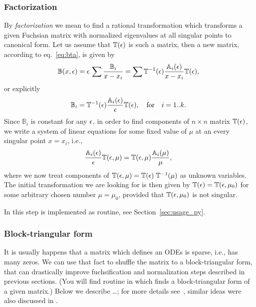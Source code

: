 \documentclass[12pt,a4paper]{article}
\def\M#1{\mathbb{#1}} %
\begin{document}
\subsubsection{Factorization}
\label{sec:fact}
By {\em factorization} we mean to find a rational transformation which transforms a given Fuchsian matrix with normalized eigenvalues at all singular points to canonical form.
Let us assume that $\M T(\eps)$ is such a matrix, then a new matrix, according to eq.~\eqref{eq:bta}, is given by
\begin{equation}
  \M B(x,\eps) = \eps\, \sum \frac{\M B_i}{x-x_i} = \sum \M T^{-1}(\eps) \frac{\M A_i(\eps)}{x-x_i} \M T(\eps),
\end{equation}
or explicitly
\begin{equation}
  \M B_i = \M T^{-1}(\eps) \frac{\M A_i(\eps)}{\eps} \M T(\eps), \quad \text{for} \quad i=1..k.
\end{equation}
Since $\M B_i$ is constant for any $\epsilon$, in order to find components of $n\times n$ matrix $\M T(\eps)$, we write a system of linear equations for some fixed value of $\mu$ at an every singular point $x=x_i$, i.e.,
\begin{equation}
  \frac{\M A_i(\eps)}{\eps} \M T(\eps,\mu) = \M T(\eps,\mu) \frac{\M A_i(\mu)}{\mu},
\end{equation}
where we now treat components of $\M T(\eps,\mu) = \M T(\eps) \; \M T^{-1}(\mu)$ as unknown variables.
The initial transformation we are looking for is then given by $\M T(\eps) = \M T(\eps,\mu_0)$ for some arbitrary chosen number $\mu = \mu_0$, provided that $\M T(\eps, \mu_0)$ is not singular.

In \fuchsia this step is implemented as  routine, see Section~\ref{sec:usage_py}.

\subsubsection{Block-triangular form}
\label{sec:blockreduce}

It is usually happens that a matrix which defines an ODEs is sparse, i.e., has many zeros.
We can use that fact to shuffle the matrix to a block-triangular form, that can drastically improve fuchsification and normalization steps described in previous sections.
(You will find  routine in \fuchsia which finds a block-triangular form of a given matrix.)
Below we describe \ldots ; for more details see~\cite[Section 7]{Lee15}, similar ideas were also discussed in \cite{Git15}.
\end{document}
